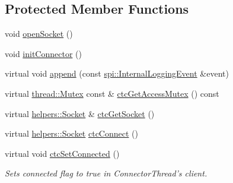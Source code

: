 \subsection*{Protected Member Functions}
\begin{DoxyCompactItemize}
\item 
void \hyperlink{classlog4cplus_1_1SocketAppender_a2f093a94b3259366261e3d302b36b5f1}{open\-Socket} ()
\item 
void \hyperlink{classlog4cplus_1_1SocketAppender_a3e9d101ab96ef2ad0c13ca98ca7f51cb}{init\-Connector} ()
\item 
virtual void \hyperlink{classlog4cplus_1_1SocketAppender_a24563c1584b094787d7a10283010ed1e}{append} (const \hyperlink{classlog4cplus_1_1spi_1_1InternalLoggingEvent}{spi\-::\-Internal\-Logging\-Event} \&event)
\item 
virtual \hyperlink{classlog4cplus_1_1thread_1_1Mutex}{thread\-::\-Mutex} const \& \hyperlink{classlog4cplus_1_1SocketAppender_a8d220a5ae6e12b246f67080312d6cc9e}{ctc\-Get\-Access\-Mutex} () const 
\item 
virtual \hyperlink{classlog4cplus_1_1helpers_1_1Socket}{helpers\-::\-Socket} \& \hyperlink{classlog4cplus_1_1SocketAppender_a02624b5b6e71895fb1b8eaf3e4a98731}{ctc\-Get\-Socket} ()
\item 
virtual \hyperlink{classlog4cplus_1_1helpers_1_1Socket}{helpers\-::\-Socket} \hyperlink{classlog4cplus_1_1SocketAppender_a354ce16aea58986a1e6e75e7ab719ebb}{ctc\-Connect} ()
\item 
virtual void \hyperlink{classlog4cplus_1_1SocketAppender_aa561aab2c474fe07dbcd8ba2fcf8fe5d}{ctc\-Set\-Connected} ()
\begin{DoxyCompactList}\small\item\em Sets connected flag to true in Connector\-Thread's client. \end{DoxyCompactList}\end{DoxyCompactItemize}
